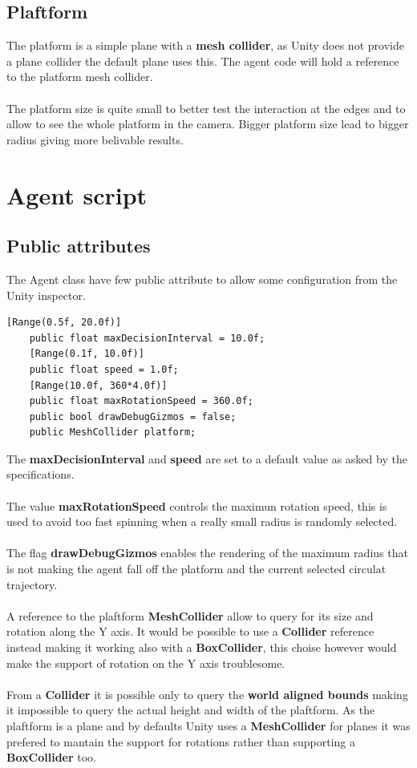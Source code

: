 \documentclass[12pt, a4paper]{article}
\begin{document}
\subsection{Plaftform}
The platform is a simple plane with a \textbf{mesh collider}, as Unity does not provide a plane collider the default plane uses this. The agent code will hold a reference to the platform mesh collider.\\\\
The platform size is quite small to better test the interaction at the edges and to allow to see the whole platform in the camera. Bigger platform size lead to bigger radius giving more belivable results.

\section{Agent script}
\subsection{Public attributes}
The Agent class have few public attribute to allow some configuration from the Unity inspector.
\begin{lstlisting}[caption={Public attributes}]
    [Range(0.5f, 20.0f)]
    public float maxDecisionInterval = 10.0f;
    [Range(0.1f, 10.0f)]
    public float speed = 1.0f;
    [Range(10.0f, 360*4.0f)]
    public float maxRotationSpeed = 360.0f;
    public bool drawDebugGizmos = false;
    public MeshCollider platform;
\end{lstlisting}
The \textbf{maxDecisionInterval} and \textbf{speed} are set to a default value as asked by the specifications.\\\\
The value \textbf{maxRotationSpeed} controls the maximun rotation speed, this is used to avoid too fast spinning when a really small radius is randomly selected.\\\\
The flag \textbf{drawDebugGizmos} enables the rendering of the maximum radius that is not making the agent fall off the platform and the current selected circulat trajectory.\\\\
A reference to the plaftform \textbf{MeshCollider} allow to query for its size and rotation along the Y axis.
It would be possible to use a \textbf{Collider} reference instead making it working also with a \textbf{BoxCollider}, this choise however would make the support of rotation on the Y axis troublesome.\\\\
From a \textbf{Collider} it is possible only to query the \textbf{world aligned bounds} making it impossible to query the actual height and width of the plaftform.
As the plaftform is a plane and by defaults Unity uses a \textbf{MeshCollider} for planes it was prefered to mantain the support for rotations rather than supporting a \textbf{BoxCollider} too.
\end{document}
